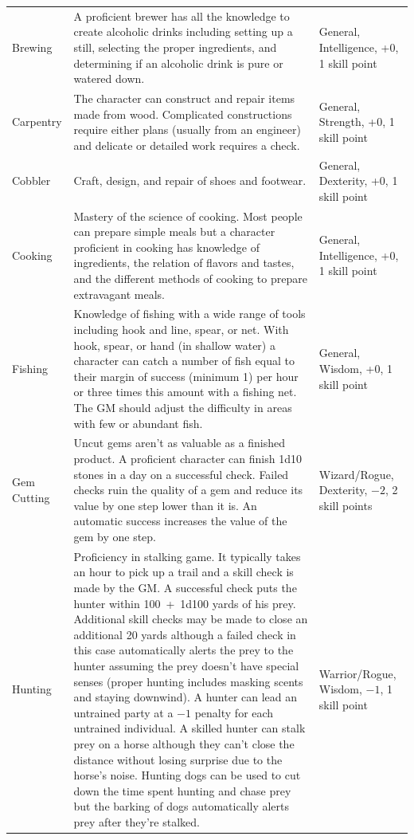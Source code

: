 \begin{longtable}{|p{}|p{}|p{}|}
Brewing	& A proficient brewer has all the knowledge to create alcoholic drinks including setting up a still, selecting the proper ingredients, and determining if an alcoholic drink is pure or watered down.	& General, Intelligence, +0, 1 skill point \\
\rowcolor[gray]{.9}Carpentry	& The character can construct and repair items made from wood.  Complicated constructions require either plans (usually from an engineer) and delicate or detailed work requires a check.	& General, Strength, +0, 1 skill point \\
Cobbler	& Craft, design, and repair of shoes and footwear.	& General, Dexterity, +0, 1 skill point \\
\rowcolor[gray]{.9}Cooking	& Mastery of the science of cooking.  Most people can prepare simple meals but a character proficient in cooking has knowledge of ingredients, the relation of flavors and tastes, and the different methods of cooking to prepare extravagant meals.	& General, Intelligence, +0, 1 skill point \\
Fishing	& Knowledge of fishing with a wide range of tools including hook and line, spear, or net.  With hook, spear, or hand (in shallow water) a character can catch a number of fish equal to their margin of success (minimum 1) per hour or three times this amount with a fishing net.  The GM should adjust the difficulty in areas with few or abundant fish.  	& General, Wisdom, +0, 1 skill point \\
\rowcolor[gray]{.9}Gem Cutting	& Uncut gems aren't as valuable as a finished product.  A proficient character can finish 1d10 stones in a day on a successful check.  Failed checks ruin the quality of a gem and reduce its value by one step lower than it is.  An automatic success increases the value of the gem by one step.	& Wizard/Rogue, Dexterity, $-2$, 2 skill points \\
Hunting	& Proficiency in stalking game.  It typically takes an hour to pick up a trail and a skill check is made by the GM.  A successful check puts the hunter within 100~+~1d100 yards of his prey.  Additional skill checks may be made to close an additional 20 yards although a failed check in this case automatically alerts the prey to the hunter assuming the prey doesn't have special senses (proper hunting includes masking scents and staying downwind).  A hunter can lead an untrained party at a $-1$ penalty for each untrained individual.  A skilled hunter can stalk prey on a horse although they can't close the distance without losing surprise due to the horse's noise.  Hunting dogs can be used to cut down the time spent hunting and chase prey but the barking of dogs automatically alerts prey after they're stalked.	& Warrior/Rogue, Wisdom, $-1$, 1 skill point \\

\end{longtable}
